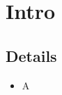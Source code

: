 \documentclass{article}
\begin{document}
\section{Intro}
\subsection{Details}
\begin{itemize}
\item A
\end{itemize}

\end{document}
